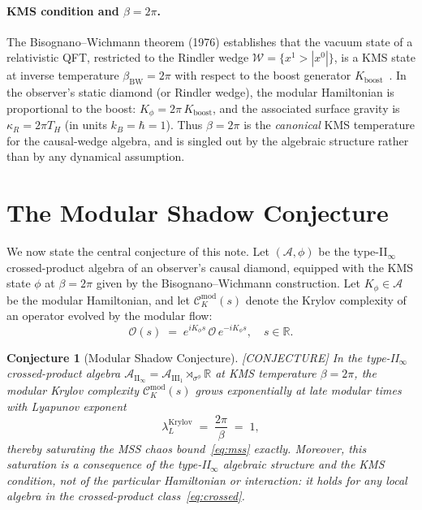 \documentclass[12pt,a4paper]{article}
\newtheorem{conjecture}{Conjecture}
\begin{document}
\paragraph{KMS condition and $\beta = 2\pi$.}
The Bisognano--Wichmann theorem (1976) establishes that the vacuum
state of a relativistic QFT, restricted to the Rindler wedge
$\mathcal{W} = \{x^1 > |x^0|\}$, is a KMS state at inverse temperature
$\beta_{\mathrm{BW}} = 2\pi$ with respect to the boost generator
$K_{\mathrm{boost}}$~\cite{BisognanoWichmann1976}.
In the observer's static diamond (or Rindler wedge), the modular
Hamiltonian is proportional to the boost:
$K_\phi = 2\pi\,K_{\mathrm{boost}}$,
and the associated surface gravity is $\kappa_R = 2\pi T_H$
(in units $k_B = \hbar = 1$).
Thus $\beta = 2\pi$ is the \emph{canonical} KMS temperature for
the causal-wedge algebra, and is singled out by the algebraic
structure rather than by any dynamical assumption.

\section{The Modular Shadow Conjecture}
\label{sec:conjecture}

We now state the central conjecture of this note.
Let $(\mathcal{A},\phi)$ be the type-II$_\infty$ crossed-product
algebra of an observer's causal diamond, equipped with the KMS state
$\phi$ at $\beta = 2\pi$ given by the Bisognano--Wichmann construction.
Let $K_\phi \in \mathcal{A}$ be the modular Hamiltonian, and let
$\mathcal{C}_K^{\mathrm{mod}}(s)$ denote the Krylov complexity of an
operator evolved by the modular flow:
\begin{equation}
  \mathcal{O}(s) \;=\; e^{iK_\phi s}\,\mathcal{O}\,e^{-iK_\phi s},
  \quad s \in \mathbb{R}.
  \label{eq:modular-flow}
\end{equation}

\begin{conjecture}[Modular Shadow Conjecture]\label{conj:msc}
\emph{[CONJECTURE]}
In the type-II$_\infty$ crossed-product algebra
$\mathcal{A}_{\mathrm{II}_\infty} = \mathcal{A}_{\mathrm{III}_1}
\rtimes_{\sigma^\phi} \mathbb{R}$ at KMS temperature $\beta = 2\pi$,
the modular Krylov complexity $\mathcal{C}_K^{\mathrm{mod}}(s)$
grows exponentially at late modular times with Lyapunov exponent
\begin{equation}
  \lambda_L^{\mathrm{Krylov}}
  \;=\; \frac{2\pi}{\beta}
  \;=\; 1,
  \label{eq:conj-main}
\end{equation}
thereby saturating the MSS chaos bound~\eqref{eq:mss} exactly.
Moreover, this saturation is a consequence of the type-II$_\infty$
algebraic structure and the KMS condition, not of the particular
Hamiltonian or interaction: it holds for any local algebra in the
crossed-product class~\eqref{eq:crossed}.
\end{conjecture}
\end{document}
